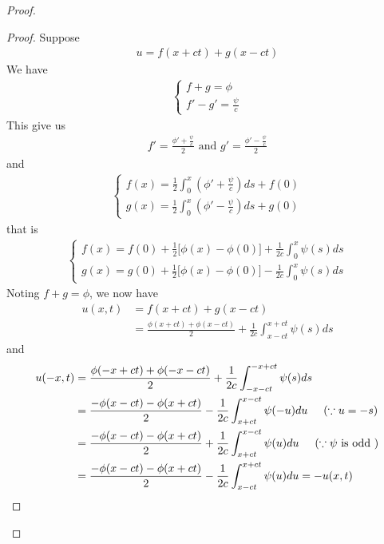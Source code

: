 \documentclass{report}
\begin{document}
\begin{proof}
\begin{proof}
Suppose 
\begin{align*}
u=f(x+ct)+g(x-ct)
\end{align*}
We have  
\begin{align*}
\begin{cases}
  f+g=\phi \\
  f'-g'= \frac{\psi }{c}
\end{cases}
\end{align*}
This give us 
\begin{align*}
f'= \frac{\phi ' + \frac{\psi}{c}}{2}\text{ and }g'= \frac{\phi' - \frac{\psi}{c}}{2}
\end{align*}
and 
\begin{align*}
\begin{cases}
f(x)= \frac{1}{2}\int_0^x (\phi' + \frac{\psi}{c})ds +f(0)\\
g(x)= \frac{1}{2}\int_0^x (\phi' - \frac{\psi}{c})ds +g(0)
\end{cases}
\end{align*}
that is 
\begin{align*}
\begin{cases}
  f(x)=f(0)+ \frac{1}{2}\Big[\phi (x)-\phi (0) \Big]+ \frac{1}{2c}\int_0^x \psi (s)ds \\
  g(x)=g(0)+ \frac{1}{2}\Big[ \phi (x)- \phi (0) \Big]- \frac{1}{2c}\int_0^x \psi (s)ds
\end{cases}
\end{align*}
Noting $f+g=\phi$, we now have 
\begin{align*}
u(x,t)&=f(x+ct)+g(x-ct) \\
&=\frac{\phi (x+ct)+ \phi (x-ct)}{2}+ \frac{1}{2c}\int^{x+ct}_{x-ct}\psi (s)ds
\end{align*}
and 
\begin{align*}
u(-x,t)&=\frac{\phi (-x+ct)+ \phi (-x-ct)}{2} + \frac{1}{2c}\int^{-x+ct}_{-x-ct}\psi (s)ds \\
&= \frac{-\phi (x-ct)-\phi (x+ct)}{2} -\frac{1}{2c}\int_{x+ct}^{x-ct}\psi (-u)du \hspace{0.5cm}(\because u=-s)\\
&=\frac{-\phi (x-ct)-\phi (x+ct)}{2} +\frac{1}{2c}\int_{x+ct}^{x-ct}\psi (u)du \hspace{0.5cm}(\because \psi\text{ is odd }) \\
&=\frac{-\phi (x-ct)-\phi (x+ct)}{2} -\frac{1}{2c}\int^{x+ct}_{x-ct}\psi (u)du = -u(x,t)
\end{align*}
\end{proof}
\begin{question}{}{}

\end{question}
\end{proof}
\end{document}
